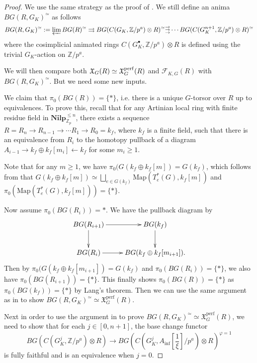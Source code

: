 \documentclass[10pt]{article}
\numberwithin{equation}{section}
\newcommand{\frakX}{{\mathfrak X}}
\newcommand{\bZ}{{\mathbb Z}}
\newcommand{\calF}{{\mathcal F}}
\newcommand{\Map}{\mathrm{Map}}
\newcommand{\perf}{\mathrm{perf}}           %
\newcommand\rightthreearrow{\substack{\rightarrow\\[-1em] \rightarrow \\[-1em] \rightarrow}
}
\begin{document}
\begin{proof}
    We use the same strategy as the proof of \cite[Proposition 3.47]{Min23}. We still define an anima $BG(R,G_K)^{\simeq}$ as follows 
\[
BG(R,G_K)^{\simeq}:=\varprojlim BG(R)^{\simeq}\rightrightarrows BG(C(G_K,\bZ/p^a)\otimes R)^{\simeq}\rightthreearrow\cdots BG(C(G_K^{n+1},\bZ/p^a)\otimes R)^{\simeq}
\]
where the cosimplicial animated rings $C(G_K^{\bullet},\bZ/p^a)\otimes R$ is defined using the trivial $G_K$-action on $\bZ/p^a$.

We will then compare both $\frakX_G(R)\simeq \frakX_G^{\rm perf}(R)$ and $ \calF_{K,G}(R)$ with $BG(R,G_K)^{\simeq}$. But we need some new inputs.

    We claim that $\pi_0(BG(R))=\{*\}$, i.e. there is a unique $G$-torsor over $R$ up to equivalences. To prove this, recall that for any Artinian local ring with finite residue field in $\textbf{Nilp}_{\bZ_p}^{\leq n}$, there exists a sequence $R=R_n\to R_{n-1}\to\cdots R_1\to R_0=k_f$, where $k_f$ is a finite field, such that there is an equivalence from $R_i$ to the homotopy pullback of a diagram $A_{i-1}\to k_f\oplus k_f[m_i]\xleftarrow{}k_f$ for some $m_i\geq 1$.

Note that for any $m\geq 1$, we have $\pi_0(G(k_f\oplus k_f[m])=G(k_f)$, which follows from that $G(k_f\oplus k_f[m])\simeq \bigsqcup_{e\in G(k_f)}\Map(T^*_e(G),k_f[m])$ and $\pi_0(\Map(T^*_e(G),k_f[m]))=\{*\}$.  
    
    Now assume $\pi_0(BG(R_i))=*$. We have the pullback diagram by \cite[Chapter 1, Proposition 7.2.2]{GR17}
    \begin{equation*}
        \xymatrix{
        BG(R_{i+1})\ar[r]\ar[d]&BG(k_f)\ar[d]\\
        BG(R_{i})\ar[r]& BG(k_f\oplus k_f[m_{i+1}]).
        }
    \end{equation*}
    Then by $\pi_0(G(k_f\oplus k_f[m_{i+1}])=G(k_f)$ and $\pi_0(BG(R_i))=\{*\}$, we also have $\pi_0(BG(R_{i+1}))=\{*\}$. This finally shows $\pi_0(BG(R))=\{*\}$ as $\pi_0(BG(k_f))=\{*\}$ by Lang's theorem. Then we can use the same argument as in \cite[Proposition 3.47]{Min23} to show $BG(R,G_K)^{\simeq}\simeq \frakX_G^{\perf}(R)$.

    Next in order to use the argument in \cite[Proposition 3.47]{Min23} to prove $BG(R,G_K)^{\simeq}\simeq  \frakX_G^{\perf}(R)$, we need to show that for each $j\in[0,n+1]$, the base change functor \[BG(C(G_K^j,\bZ/p^a)\otimes R)\to BG(C(G_K^j,A_{\inf}[\frac{1}{\xi}]/p^a)\otimes R)^{\varphi=1}\] is fully faithful and is an equivalence when $j=0$. 
    

\end{proof}
\end{document}
